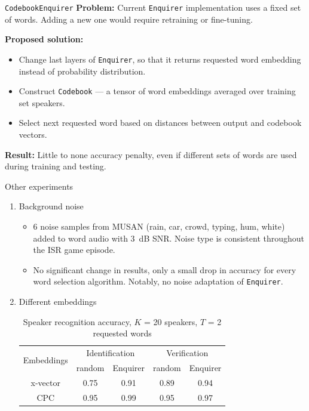 \documentclass[11pt, aspectratio=169]{beamer}
\newcommand{\enquirer}{\texttt{Enquirer}}
\begin{document}
\begin{frame}{\texttt{CodebookEnquirer}}
    \textbf{Problem:} Current \enquirer{} implementation uses a fixed set of
    words. Adding a new one would require retraining or fine-tuning.

    \textbf{Proposed solution:}
    \begin{itemize}
        \item Change last layers of \enquirer{}, so that it returns requested
        word embedding instead of probability distribution.
        \item Construct \texttt{Codebook} --- a tensor of word embeddings
        averaged over training set speakers.
        \item Select next requested word based on distances between output
        and codebook vectors.
    \end{itemize}

    \textbf{Result:} Little to none accuracy penalty, even if different sets of
    words are used during training and testing.
\end{frame}

\begin{frame}{Other experiments}
    \begin{enumerate}
        \item Background noise

        \begin{itemize}
            \item 6 noise samples from MUSAN (rain, car, crowd, typing, hum,
            white) added to word audio with 3~dB SNR\@. Noise type is
            consistent throughout the ISR game episode.
            \item No significant change in results, only a small drop in
            accuracy for every word selection algorithm. Notably, no noise
            adaptation of \enquirer{}.
        \end{itemize}

        \item Different embeddings\vspace{.5em}

        \begin{table}[bht]
            \begin{tabular}{c c c c c}
                \toprule
                \multirow{2}{5em}{Embeddings}
                    & \multicolumn{2}{c}{Identification}
                    & \multicolumn{2}{c}{Verification}\\
                & random & Enquirer & random & Enquirer\\
                \midrule
                x-vector & 0.75 & 0.91 & 0.89 & 0.94\\
                CPC & 0.95 & 0.99 & 0.95 & 0.97\\
                \bottomrule
            \end{tabular}
            \caption*{Speaker recognition accuracy, $K$ = 20 speakers,
                      $T$ = 2 requested words}
        \end{table}

    \end{enumerate}
\end{frame}
\end{document}
